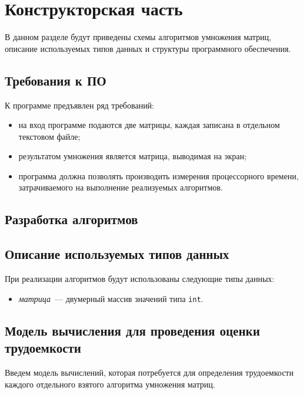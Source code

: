 \chapter{Конструкторская часть}

В данном разделе будут приведены схемы алгоритмов умножения матриц, описание используемых типов данных и структуры программного обеспечения.

\section{Требования к ПО}

К программе предъявлен ряд требований:

\begin{itemize}
    \item на вход программе подаются две матрицы, каждая записана в отдельном текстовом файле;
    \item результатом умножения является матрица, выводимая на экран;
    \item программа должна позволять производить измерения процессорного времени, затрачиваемого на выполнение реализуемых алгоритмов.
\end{itemize}

\section{Разработка алгоритмов}

\section{Описание используемых типов данных}

При реализации алгоритмов будут использованы следующие типы данных:

\begin{itemize}
    \item \textit{матрица}~--- двумерный массив значений типа \texttt{int}.
\end{itemize}

\section{Модель вычисления для проведения оценки трудоемкости}

Введем модель вычислений, которая потребуется для определения трудоемкости каждого отдельного взятого алгоритма умножения матриц.

